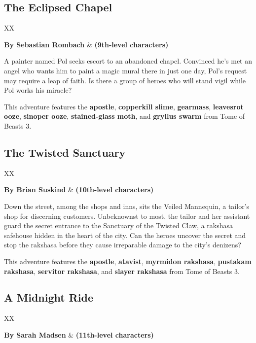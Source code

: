 \documentclass[10pt,a4paper,twoside,bg=print,twocolumn,openany,nodeprecatedcode]{dndbook}
\begin{document}
\subsection{The Eclipsed Chapel}

\begin{DndTable}{XX}

\textbf{By Sebastian Rombach} & \textbf{(9th-level characters)}\\
\end{DndTable}

A painter named Pol seeks escort to an abandoned chapel. Convinced he's met an angel who wants him to paint a magic mural there in just one day, Pol's request may require a leap of faith. Is there a group of heroes who will stand vigil while Pol works his miracle?

This adventure features the \textbf{apostle}, \textbf{copperkill slime}, \textbf{gearmass}, \textbf{leavesrot ooze}, \textbf{sinoper ooze}, \textbf{stained-glass moth}, and \textbf{gryllus swarm} from Tome of Beasts 3.

\subsection{The Twisted Sanctuary}

\begin{DndTable}{XX}

\textbf{By Brian Suskind} & \textbf{(10th-level characters)}\\
\end{DndTable}

Down the street, among the shops and inns, sits the Veiled Mannequin, a tailor's shop for discerning customers. Unbeknownst to most, the tailor and her assistant guard the secret entrance to the Sanctuary of the Twisted Claw, a rakshasa safehouse hidden in the heart of the city. Can the heroes uncover the secret and stop the rakshasa before they cause irreparable damage to the city's denizens?

This adventure features the \textbf{apostle}, \textbf{atavist}, \textbf{myrmidon rakshasa}, \textbf{pustakam rakshasa}, \textbf{servitor rakshasa}, and \textbf{slayer rakshasa} from Tome of Beasts 3.

\subsection{A Midnight Ride}

\begin{DndTable}{XX}

\textbf{By Sarah Madsen} & \textbf{(11th-level characters)}\\
\end{DndTable}
\end{document}
